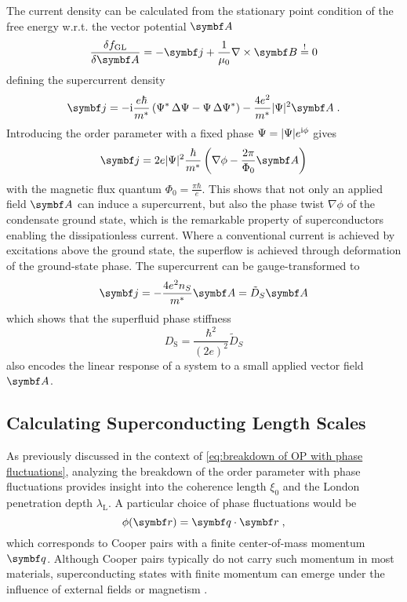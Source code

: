 \documentclass[../notes.tex]{subfiles}
\begin{document}
The current density can be calculated from the stationary point condition of the free energy w.r.t. the vector potential \(\vb{A}\)
\begin{equation}
	\fdv{f_{\mathrm{GL}}}{\vb{A}} = -\vb{j} + \frac{1}{\mu_0} \nabla \times \vb{B} \overset{!}{=} 0
\end{equation}
defining the supercurrent density
\begin{equation}
	\vb{j} = -\iu \frac{e\hbar}{m^*} \left(\Psi^* \adif{\Psi} - \Psi \adif{\Psi^*}\right) - \frac{4 e^2}{m^*} \vert \Psi \vert^2 \vb{A} \;.
	\label{eq:supercurrent density GL theory with phase and vector potential}
\end{equation}
Introducing the order parameter with a fixed phase \(\Psi = \vert \Psi \vert e^{\mathrm{i} \phi}\) gives
\begin{equation}
	\vb{j} = 2 e \vert \Psi \vert^2 \frac{\hbar}{m^*} \left(\nabla \phi - \frac{2 \pi}{\Phi_0} \vb{A} \right)
\end{equation}
with the magnetic flux quantum \(\Phi_0 = \frac{\pi \hbar}{e}\).
This shows that not only an applied field \(\vb{A}\) can induce a supercurrent, but also the phase twist \(\nabla \phi\) of the condensate ground state, which is the remarkable property of superconductors enabling the dissipationless current.
Where a conventional current is achieved by excitations above the ground state, the superflow is achieved through deformation of the ground-state phase.
The supercurrent can be gauge-transformed to
\begin{equation}
	\vb{j} = -\frac{4e^2 n_S}{m^*} \vb{A} = \tilde{D}_S \vb{A}
\end{equation}
which shows that the superfluid phase stiffness
\begin{equation}
	D_{\mathrm{S}} = \frac{\hbar^2}{(2e)^2} \tilde{D}_S
\end{equation}
also encodes the linear response of a system to a small applied vector field \(\vb{A}\).



\subsection*{Calculating Superconducting Length Scales}

As previously discussed in the context of \cref{eq:breakdown of OP with phase fluctuations}, analyzing the breakdown of the order parameter with phase fluctuations provides insight into the coherence length \(\xi_0\) and the London penetration depth \(\lambda_{\mathrm{L}}\).
A particular choice of phase fluctuations would be
\begin{equation}
	\phi (\vb{r}) = \vb{q} \cdot \vb{r} \;,
	\label{eq:phase fluctuations for finite momentum pairing}
\end{equation}
which corresponds to Cooper pairs with a finite center-of-mass momentum \(\vb{q}\).
Although Cooper pairs typically do not carry such momentum in most materials, superconducting states with finite momentum can emerge under the influence of external fields or magnetism \cite{chenFiniteMomentumCooper2018, wanOrbitalFuldeFerrell2023, yuanSupercurrentDiodeEffect2022}.
\end{document}
